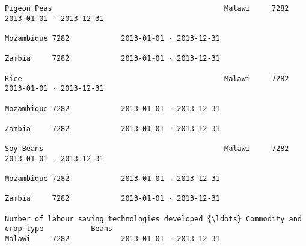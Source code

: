 \documentclass[11pt]{article}
\begin{document}
\begin{Verbatim}[commandchars=\\\{\}]
                                                                                                                                                              Pigeon Peas                                        Malawi     7282            2013-01-01 - 2013-12-31   
                                                                                                                                                                                                                 Mozambique 7282            2013-01-01 - 2013-12-31   
                                                                                                                                                                                                                 Zambia     7282            2013-01-01 - 2013-12-31   
                                                                                                                                                              Rice                                               Malawi     7282            2013-01-01 - 2013-12-31   
                                                                                                                                                                                                                 Mozambique 7282            2013-01-01 - 2013-12-31   
                                                                                                                                                                                                                 Zambia     7282            2013-01-01 - 2013-12-31   
                                                                                                                                                              Soy Beans                                          Malawi     7282            2013-01-01 - 2013-12-31   
                                                                                                                                                                                                                 Mozambique 7282            2013-01-01 - 2013-12-31   
                                                                                                                                                                                                                 Zambia     7282            2013-01-01 - 2013-12-31   
                                                                         Number of labour saving technologies developed {\ldots} Commodity and crop type           Beans                                              Malawi     7282            2013-01-01 - 2013-12-31   

\end{Verbatim}
\end{document}
